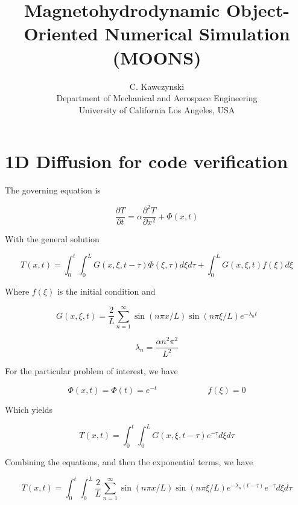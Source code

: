 \documentclass[11pt]{article}
\begin{document}
\doublespacing
\title{Magnetohydrodynamic Object-Oriented Numerical Simulation (MOONS)}
\author{C. Kawczynski \\
Department of Mechanical and Aerospace Engineering \\
University of California Los Angeles, USA\\
}
\maketitle

\section{1D Diffusion for code verification}
The governing equation is

\begin{equation}
	\frac{\partial T}{\partial t} = \alpha \frac{\partial^2 T}{\partial x^2} + \Phi(x,t)
\end{equation}

With the general solution

\begin{equation}
	T(x,t) = \int_0^t \int_0^L G(x,\xi,t-\tau) \Phi(\xi,\tau) d\xi d\tau
	+
	\int_0^L G(x,\xi,t) f(\xi) d\xi
\end{equation}

Where $f(\xi)$ is the initial condition and 

\begin{equation}
	G(x,\xi,t) = \frac{2}{L} \sum_{n=1}^{\infty}
	\sin(n\pi x/L)
	\sin(n\pi \xi/L)
	e^{-\lambda_n t}
\end{equation}

\begin{equation}
	\lambda_n = \frac{\alpha n^2\pi^2}{L^2}
\end{equation}

For the particular problem of interest, we have

\begin{equation}
	\Phi(x,t) = \Phi(t) = e^{-t} \qquad \qquad \qquad f(\xi) = 0
\end{equation}

Which yields

\begin{equation}
	T(x,t) = \int_0^t \int_0^L G(x,\xi,t-\tau) e^{-\tau} d\xi d\tau
\end{equation}

Combining the equations, and then the exponential terms, we have

\begin{equation}
	T(x,t) = \int_0^t \int_0^L 
	\frac{2}{L} \sum_{n=1}^{\infty}
	\sin(n\pi x/L)
	\sin(n\pi \xi/L)
	e^{-\lambda_n (t-\tau)}
	e^{-\tau}
	d\xi d\tau
\end{equation}
\end{document}
